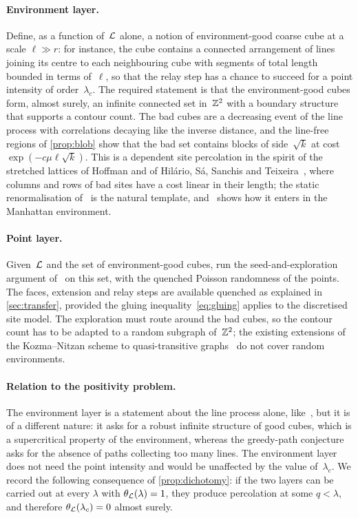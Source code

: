 \documentclass[11pt,letterpaper]{article}
\begin{document}
\paragraph{Environment layer.} Define, as a function of~$\mathcal L$ alone, a notion of environment-good coarse cube at a scale $\ell\gg r$: for instance, the cube contains a connected arrangement of lines joining its centre to each neighbouring cube with segments of total length bounded in terms of~$\ell$, so that the relay step has a chance to succeed for a point intensity of order~$\lambda_c$. The required statement is that the environment-good cubes form, almost surely, an infinite connected set in~$\mathbb Z^2$ with a boundary structure that supports a contour count. The bad cubes are a decreasing event of the line process with correlations decaying like the inverse distance, and the line-free regions of \cref{prop:blob} show that the bad set contains blocks of side~$\sqrt k$ at cost $\exp(-c\mu\ell\sqrt k)$. This is a dependent site percolation in the spirit of the stretched lattices of Hoffman and of Hil\'ario, S\'a, Sanchis and Teixeira~\cite{HSST26}, where columns and rows of bad sites have a cost linear in their length; the static renormalisation of~\cite{HSST26} is the natural template, and~\cite{JJV23} shows how it enters in the Manhattan environment.

\paragraph{Point layer.} Given~$\mathcal L$ and the set of environment-good cubes, run the seed-and-exploration argument of~\cite{Pei26} on this set, with the quenched Poisson randomness of the points. The faces, extension and relay steps are available quenched as explained in \cref{sec:transfer}, provided the gluing inequality~\eqref{eq:gluing} applies to the discretised site model. The exploration must route around the bad cubes, so the contour count has to be adapted to a random subgraph of~$\mathbb Z^2$; the existing extensions of the Kozma--Nitzan scheme to quasi-transitive graphs~\cite{OAI26b} do not cover random environments.

\paragraph{Relation to the positivity problem.} The environment layer is a statement about the line process alone, like~\cite[Conjecture~7.2]{HJ26sub}, but it is of a different nature: it asks for a robust infinite structure of good cubes, which is a supercritical property of the environment, whereas the greedy-path conjecture asks for the absence of paths collecting too many lines. The environment layer does not need the point intensity and would be unaffected by the value of~$\lambda_c$. We record the following consequence of \cref{prop:dichotomy}: if the two layers can be carried out at every $\lambda$ with $\theta_\mathcal L(\lambda)=1$, they produce percolation at some $q<\lambda$, and therefore $\theta_\mathcal L(\lambda_c)=0$ almost surely.
\end{document}
